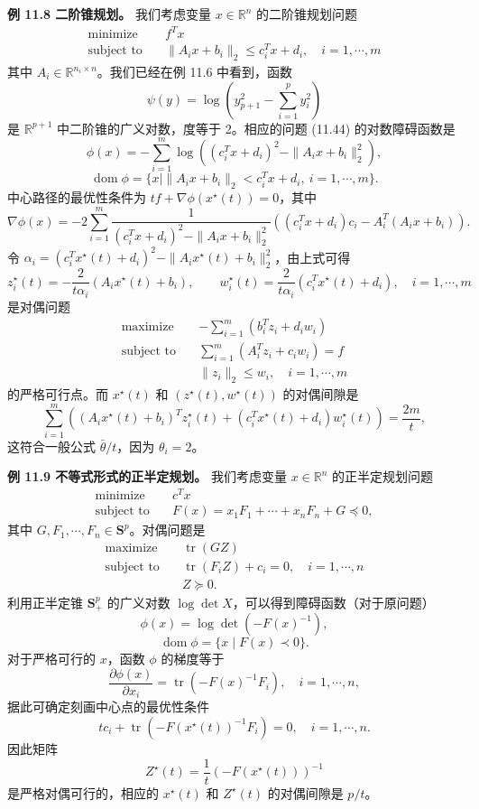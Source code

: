 \documentclass[UTF8,12pt,a4paper,fontset=fandol]{ctexart}
\begin{document}
\noindent\textbf{例 11.8 二阶锥规划。} 我们考虑变量 $x\in\mathbb{R}^n$ 的二阶锥规划问题
\begin{equation}
\begin{aligned}
\text{minimize}\quad & f^Tx\\
\text{subject to}\quad & \|A_ix+b_i\|_2\leq c_i^Tx+d_i,\quad i=1,\cdots,m
\end{aligned}
\tag{11.44}
\end{equation}
其中 $A_i\in\mathbb{R}^{n_i\times n}$。我们已经在例 11.6 中看到，函数
\[
\psi(y)=\log\left(y_{p+1}^2-\sum_{i=1}^p y_i^2\right)
\]
是 $\mathbb{R}^{p+1}$ 中二阶锥的广义对数，度等于 2。相应的问题 (11.44) 的对数障碍函数是
\begin{equation}
\phi(x)=-\sum_{i=1}^m\log\left((c_i^Tx+d_i)^2-\|A_ix+b_i\|_2^2\right),
\tag{11.45}
\end{equation}
\[
\operatorname{dom}\phi=\{x\mid \|A_ix+b_i\|_2<c_i^Tx+d_i,\ i=1,\cdots,m\}.
\]
中心路径的最优性条件为 $tf+\nabla\phi(x^\star(t))=0$，其中
\[
\nabla\phi(x)=-2\sum_{i=1}^m
\frac{1}{(c_i^Tx+d_i)^2-\|A_ix+b_i\|_2^2}
\left((c_i^Tx+d_i)c_i-A_i^T(A_ix+b_i)\right).
\]
令 $\alpha_i=(c_i^Tx^\star(t)+d_i)^2-\|A_ix^\star(t)+b_i\|_2^2$，由上式可得
\[
z_i^\star(t)=-\frac{2}{t\alpha_i}(A_ix^\star(t)+b_i),\qquad
w_i^\star(t)=\frac{2}{t\alpha_i}(c_i^Tx^\star(t)+d_i),\quad i=1,\cdots,m
\]
是对偶问题
\[
\begin{aligned}
\text{maximize}\quad & -\sum_{i=1}^m(b_i^Tz_i+d_iw_i)\\
\text{subject to}\quad & \sum_{i=1}^m(A_i^Tz_i+c_iw_i)=f\\
& \|z_i\|_2\leq w_i,\quad i=1,\cdots,m
\end{aligned}
\]
的严格可行点。而 $x^\star(t)$ 和 $(z^\star(t),w^\star(t))$ 的对偶间隙是
\[
\sum_{i=1}^m\left((A_ix^\star(t)+b_i)^Tz_i^\star(t)+(c_i^Tx^\star(t)+d_i)w_i^\star(t)\right)=\frac{2m}{t},
\]
这符合一般公式 $\bar{\theta}/t$，因为 $\theta_i=2$。

\noindent\textbf{例 11.9 不等式形式的正半定规划。} 我们考虑变量 $x\in\mathbb{R}^n$ 的正半定规划问题
\[
\begin{aligned}
\text{minimize}\quad & c^Tx\\
\text{subject to}\quad & F(x)=x_1F_1+\cdots+x_nF_n+G\preceq 0,
\end{aligned}
\]
其中 $G,F_1,\cdots,F_n\in\mathbf{S}^p$。对偶问题是
\[
\begin{aligned}
\text{maximize}\quad & \operatorname{tr}(GZ)\\
\text{subject to}\quad & \operatorname{tr}(F_iZ)+c_i=0,\quad i=1,\cdots,n\\
& Z\succeq 0.
\end{aligned}
\]
利用正半定锥 $\mathbf{S}_+^p$ 的广义对数 $\log\det X$，可以得到障碍函数（对于原问题）
\[
\phi(x)=\log\det(-F(x)^{-1}),
\]
\[
\operatorname{dom}\phi=\{x\mid F(x)\prec 0\}.
\]
对于严格可行的 $x$，函数 $\phi$ 的梯度等于
\[
\frac{\partial\phi(x)}{\partial x_i}=\operatorname{tr}(-F(x)^{-1}F_i),\quad i=1,\cdots,n,
\]
据此可确定刻画中心点的最优性条件
\[
tc_i+\operatorname{tr}(-F(x^\star(t))^{-1}F_i)=0,\quad i=1,\cdots,n.
\]
因此矩阵
\[
Z^\star(t)=\frac{1}{t}(-F(x^\star(t)))^{-1}
\]
是严格对偶可行的，相应的 $x^\star(t)$ 和 $Z^\star(t)$ 的对偶间隙是 $p/t$。
\end{document}
